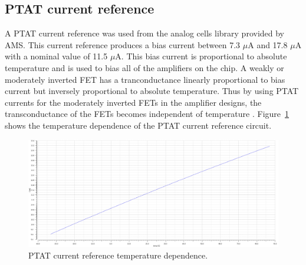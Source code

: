 \documentclass[12pt,oneside,final]{siuethesis}
\theoremstyle{definition}
\begin{document}
\subsection{PTAT current reference}
\par A PTAT current reference was used from the analog cells library provided by AMS. This current reference produces a bias current between 7.3 $\mu$A and 17.8 $\mu$A with a nominal value of 11.5 $\mu$A. This bias current is proportional to absolute temperature and is used to bias all of the amplifiers on the chip. A weakly or moderately inverted FET has a tranconductance linearly proportional to bias current but inversely proportional to absolute temperature. Thus by using PTAT currents for the moderately inverted FETs in the amplifier designs, the transconductance of the FETs becomes independent of temperature \cite{ALLEN}. Figure~\ref{fig:ptat} shows the temperature dependence of the PTAT current reference circuit.

\begin{figure}[htbp!]
\centering
\includegraphics[scale=.3,keepaspectratio=true]{../data/ptat.png} 
\caption{PTAT current reference temperature dependence.}
\label{fig:ptat}
\end{figure}
\end{document}
